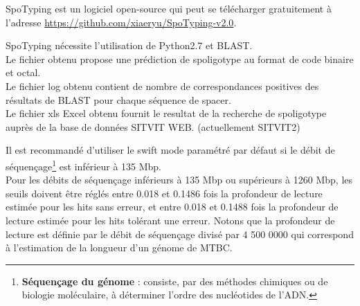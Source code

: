 \documentclass[twoside,a4paper,11pt,frenchb,openany]{report}
\begin{document}
SpoTyping est un logiciel open-source qui peut se télécharger gratuitement à l'adresse \url{https://github.com/xiaeryu/SpoTyping-v2.0}.

SpoTyping nécessite l'utilisation de Python2.7 et BLAST.\\
Le fichier obtenu propose une prédiction de spoligotype au format de code binaire et octal.\\
Le fichier log obtenu contient de nombre de correspondances positives des résultats de BLAST pour chaque séquence de spacer.\\
Le fichier xls Excel obtenu fournit le resultat de la recherche de spoligotype auprès de la base de données SITVIT WEB. (actuellement SITVIT2)

Il est recommandé d'utiliser le swift mode paramétré par défaut si le débit de séquençage\footnote{\textbf{Séquençage du génome} : consiste, par des méthodes chimiques ou de biologie moléculaire, à déterminer l'ordre des nucléotides de l'ADN.} est inférieur à 135 Mbp.\\
Pour les débits de séquençage inférieurs à 135 Mbp ou supérieurs à 1260 Mbp, les seuils doivent être réglés entre 0.018 et 0.1486 fois la profondeur de lecture estimée pour les hits sans erreur, et entre 0.018 et 0.1488 fois la profondeur de lecture estimée pour les hits tolérant une erreur. Notons que la profondeur de lecture est définie par le débit de séquençage divisé par 4 500 0000 qui correspond à l'estimation de la longueur d'un génome de MTBC.



\end{document}
